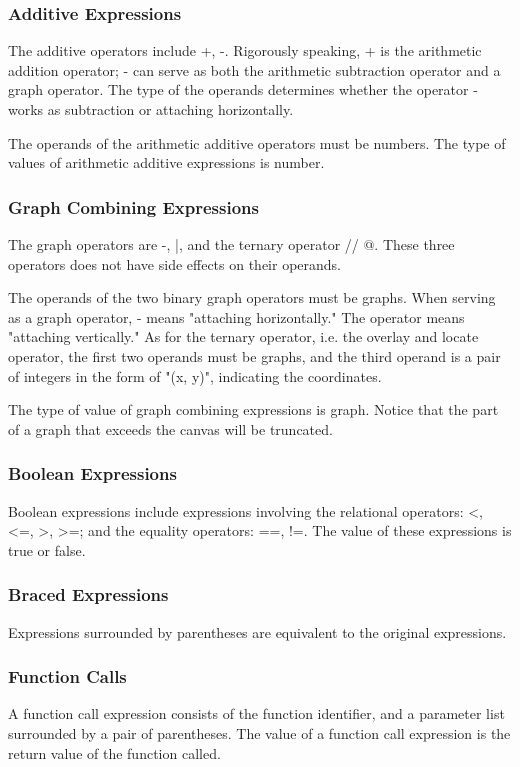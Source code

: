 \documentclass[11pt,letterpaper]{article}
\begin{document}
\subsubsection {Additive Expressions}
The additive operators include +, -. Rigorously speaking,  + is the arithmetic addition operator; - can serve as both the arithmetic subtraction operator and a graph operator. The type of the operands determines whether the operator - works as subtraction or attaching horizontally.

The operands of the arithmetic additive operators must be numbers. The type of values of arithmetic additive expressions is number.

\subsubsection {Graph Combining Expressions}
The graph operators are -, |, and the ternary operator // @. These three operators does not have side effects on their operands.

The operands of the two binary graph operators must be graphs. When serving as a graph operator, - means "attaching horizontally." The operator \textbar means "attaching vertically." As for the ternary operator, i.e. the overlay and locate operator, the first two operands must be graphs, and the third operand is a pair of integers in the form of "(x, y)", indicating the coordinates.

The type of value of graph combining expressions is graph. Notice that the part of a graph that exceeds the canvas will be truncated.

\subsubsection {Boolean Expressions}
Boolean expressions include expressions involving the relational operators: <, <=, >, >=;  and the equality operators: ==, !=. The value of these expressions is true or false.

\subsubsection {Braced Expressions}
Expressions surrounded by parentheses are equivalent to the original expressions.

\subsubsection {Function Calls}
A function call expression consists of the function identifier, and a parameter list surrounded by a pair of parentheses. The value of a function call expression is the return value of the function called.
\end{document}
